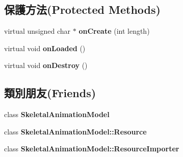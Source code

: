 \subsection*{保護方法(Protected Methods)}
\begin{DoxyCompactItemize}
\item 
virtual unsigned char $\ast$ {\bfseries on\+Create} (int length)\hypertarget{class_i_dream_sky_1_1_skeletal_animation_model_1_1_resource_afd5953aebaa85c6dc685ad53731cc97b}{}\label{class_i_dream_sky_1_1_skeletal_animation_model_1_1_resource_afd5953aebaa85c6dc685ad53731cc97b}

\item 
virtual void {\bfseries on\+Loaded} ()\hypertarget{class_i_dream_sky_1_1_skeletal_animation_model_1_1_resource_aa1403b8640e3af591b65e65b3fc9b442}{}\label{class_i_dream_sky_1_1_skeletal_animation_model_1_1_resource_aa1403b8640e3af591b65e65b3fc9b442}

\item 
virtual void {\bfseries on\+Destroy} ()\hypertarget{class_i_dream_sky_1_1_skeletal_animation_model_1_1_resource_ad57c26c1178418ee1e5fe4379ef50ffb}{}\label{class_i_dream_sky_1_1_skeletal_animation_model_1_1_resource_ad57c26c1178418ee1e5fe4379ef50ffb}

\end{DoxyCompactItemize}
\subsection*{類別朋友(Friends)}
\begin{DoxyCompactItemize}
\item 
class {\bfseries Skeletal\+Animation\+Model}\hypertarget{class_i_dream_sky_1_1_skeletal_animation_model_1_1_resource_a40c4f607e5b71602c57777a29d5b4d31}{}\label{class_i_dream_sky_1_1_skeletal_animation_model_1_1_resource_a40c4f607e5b71602c57777a29d5b4d31}

\item 
class {\bfseries Skeletal\+Animation\+Model\+::\+Resource}\hypertarget{class_i_dream_sky_1_1_skeletal_animation_model_1_1_resource_a03db6ab76f332ee14ec97e5d96551a14}{}\label{class_i_dream_sky_1_1_skeletal_animation_model_1_1_resource_a03db6ab76f332ee14ec97e5d96551a14}

\item 
class {\bfseries Skeletal\+Animation\+Model\+::\+Resource\+Importer}\hypertarget{class_i_dream_sky_1_1_skeletal_animation_model_1_1_resource_a5a7f6f4bf128e31a6e3ac67376ccff10}{}\label{class_i_dream_sky_1_1_skeletal_animation_model_1_1_resource_a5a7f6f4bf128e31a6e3ac67376ccff10}

\end{DoxyCompactItemize}
